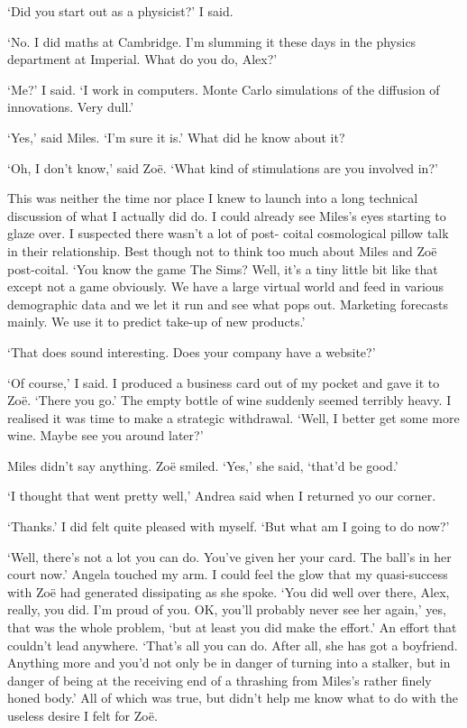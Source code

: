 `Did you start out as a physicist?' I said.

`No. I did maths at Cambridge. I'm slumming it these days
in the physics department at Imperial. What do you do, Alex?'

`Me?' I said. `I work in computers. Monte Carlo simulations of the
diffusion of innovations. Very dull.'

`Yes,' said Miles. `I'm sure it is.' What did he know about
it?

`Oh, I don't know,' said Zo{\"e}. `What kind of stimulations are you
involved in?'

This was neither the time nor place I knew to launch into a long
technical discussion of what I actually did do. I could already see Miles's eyes
starting to glaze over. I suspected there wasn't a lot of post-
coital cosmological pillow talk in their relationship. Best though not to
think too much about Miles and Zo{\"e} post-coital. `You know the
game {\twelvesl The Sims\/}? Well, it's a tiny little bit like that except not a game obviously.
We have a large virtual world and feed in various demographic data
and we let it run and see what pops out. Marketing forecasts mainly.
We use it to predict take-up of new products.'

`That does sound interesting. Does your company have a website?'

`Of course,' I said. I produced a business card out of my pocket and
gave it to Zo{\"e}. `There you go.' The empty bottle of wine suddenly seemed terribly heavy. I realised it was time to make a strategic
withdrawal. `Well, I better get some more wine. Maybe see you around
later?'

Miles didn't say anything. Zo{\"e} smiled. `Yes,' she said, `that'd
be good.'

`I thought that went pretty well,' Andrea said when I returned yo
our corner.

`Thanks.' I did felt quite pleased with myself. `But what am I going
to do now?'

`Well, there's not a lot you can do. You've given her your card. The
ball's in her court now.' Angela touched my arm. I could feel the
glow that my quasi-success with Zo{\"e} had generated dissipating as
she spoke. `You did well over there, Alex, really, you did. I'm
proud of you. OK, you'll probably never see her again,' yes, that
was the whole problem, `but at least you did make the effort.' An
effort that couldn't lead anywhere. `That's all you can do. After
all, she has got a boyfriend. Anything more and you'd not only be in
danger of turning into a stalker, but in danger of being at the
receiving end of a thrashing from Miles's rather finely honed body.'
All of which was true, but didn't help me know what to do with the
useless desire I felt for Zo{\"e}.

